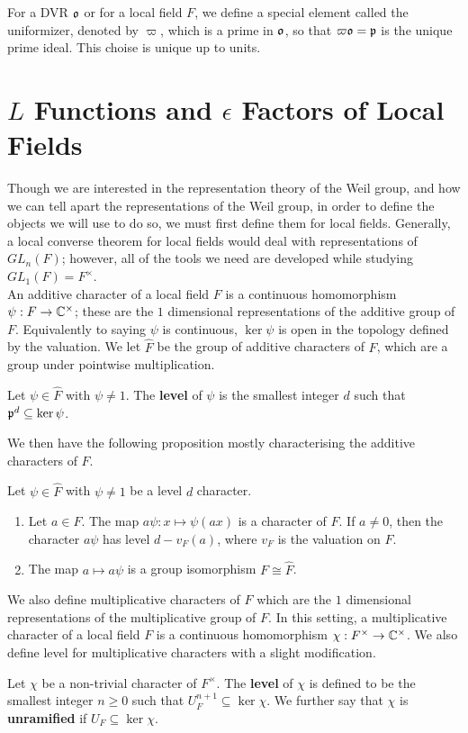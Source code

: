 For a DVR $\mathfrak{o}$ or for a local field $F$, we define a special element called the uniformizer, denoted by $\varpi$, which is a prime in $\mathfrak{o}$, so that $\varpi \mathfrak{o} = \mathfrak{p}$ is the unique prime ideal.
This choise is unique up to units.

\section{$L$ Functions and $\epsilon$ Factors of Local Fields}
\label{sec:Leps-LF}
Though we are interested in the representation theory of the Weil group, and how we can tell apart the representations of the Weil group, in order to define the objects we will use to do so, we must first define them for local fields.
Generally, a local converse theorem for local fields would deal with representations of $GL_n(F)$; however, all of the tools we need are developed while studying $GL_1(F) = F^\times$.\\

An additive character of a local field $F$ is a continuous homomorphism $\psi: F \to \mathbb{C}^\times$; these are the $1$ dimensional representations of the additive group of $F$.
Equivalently to saying $\psi$ is continuous, $\ker \psi$ is open in the topology defined by the valuation.
We let $\hat{F}$ be the group of additive characters of $F$, which are a group under pointwise multiplication.
\begin{defn}
  Let $\psi \in \hat{F}$ with $\psi \neq 1$.
  The \textbf{level} of $\psi$ is the smallest integer $d$ such that $\mathfrak{p}^d \subseteq \ker \psi$.
\end{defn}
We then have the following proposition mostly characterising the additive characters of $F$.
\begin{prop}
  Let $\psi \in \hat{F}$ with $\psi \neq 1$ be a level $d$ character.
  \begin{enumerate}
    \item Let $a \in F$. The map $a \psi : x \mapsto \psi(ax)$ is a character of $F$. If $a \neq 0$, then the character $a \psi$ has level $d - v_F(a)$, where $v_F$ is the valuation on $F$.
    \item The map $a \mapsto a \psi$ is a group isomorphism $F \cong \hat{F}$.
  \end{enumerate}
\end{prop}

We also define multiplicative characters of $F$ which are the $1$ dimensional representations of the multiplicative group of $F$.
In this setting, a multiplicative character of a local field $F$ is a continuous homomorphism $\chi : F^\times \to \mathbb{C}^\times$.
We also define level for multiplicative characters with a slight modification.
\begin{defn}
  Let $\chi$ be a non-trivial character of $F^\times$.
  The \textbf{level} of $\chi$ is defined to be the smallest integer $n \geq 0$ such that $U^{n+1}_F \subseteq \ker \chi$.
  We further say that $\chi$ is \textbf{unramified} if $U_F \subseteq \ker \chi$.
\end{defn}

